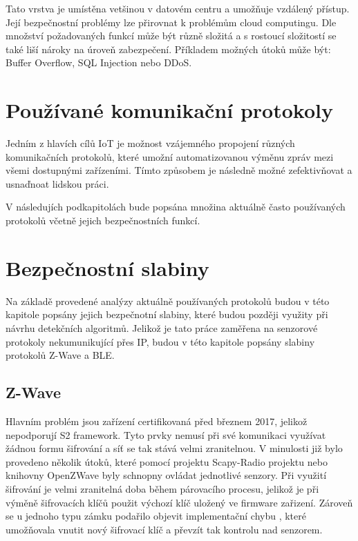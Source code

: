  Tato vrstva je umístěna vetšinou v datovém centru a umožňuje vzdálený přístup. 
 Její bezpečnostní problémy lze přirovnat k problémům cloud computingu. Dle
 množství požadovaných funkcí může být různě složitá a s rostoucí složitostí
 se také liší nároky na úroveň zabezpečení. Příkladem možných útoků může být:
 Buffer Overflow, SQL Injection nebo DDoS.
 
 \newpage
 
 \section{Používané komunikační protokoly} \label{protokoly}
 Jedním z hlavích cílů IoT je možnost vzájemného propojení různých komunikačních protokolů, 
 které umožní automatizovanou výměnu zpráv mezi všemi dostupnými zařízeními. Tímto způsobem
 je následně možné zefektivňovat a usnaďnoat lidskou práci.
 
 V následujích podkapitolách bude popsána množina aktuálně často používaných protokolů
 včetně jejich bezpečnostních funkcí.
 
  
   
   \newpage
  \section{Bezpečnostní slabiny}
  Na základě provedené analýzy aktuálně používaných protokolů budou v této kapitole 
  popsány jejich bezpečnotní slabiny, které budou později využity při návrhu 
  detekčních algoritmů. Jelikož je tato práce zaměřena na senzorové protokoly 
  nekumunikující přes IP, budou v této kapitole popsány slabiny protokolů 
  Z-Wave a BLE.
  
 \subsection{Z-Wave}
 Hlavním problém jsou zařízení certifikovaná před březnem 2017, jelikož nepodporují S2 framework.
 Tyto prvky nemusí při své komunikaci využívat žádnou formu šifrování a síť se tak stává 
 velmi zranitelnou. V minulosti již bylo provedeno několik útoků, které pomocí projektu
 Scapy-Radio projektu \cite{ezwave} nebo knihovny OpenZWave  byly schnopny ovládat jednotlivé senzory. 
 Při využití šifrování je velmi zranitelná doba během párovacího procesu, jelikož je při výměně
 šifrovacích klíčů použit výchozí klíč uložený ve firmware zařizení. Zároveň se 
 u jednoho typu zámku podařilo objevit implementační chybu \cite{zwave-S0-attack}, které umožňovala vnutit 
 nový šifrovací klíč a převzít tak kontrolu nad senzorem. 
 
